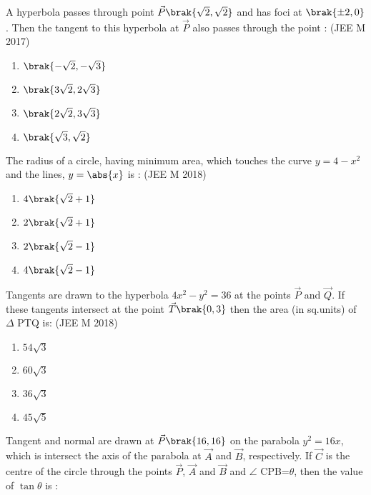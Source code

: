 
\iffalse
  \title{Conic-section}
  \author{Malakala bala subrahmanya aravind}
  \section{mcq-single}
\fi

\item A hyperbola passes through point $\vec{P}\brak{\sqrt2,\sqrt2}$  and  has  foci  at $\brak{\pm2,0}$. Then  the  tangent  to  this  hyperbola at $\vec{P}$ also passes through the point :
      \hfill{(JEE M 2017)} 
	\begin{enumerate}
    		\item  $\brak{-\sqrt2,-\sqrt3}$
    		\item  $\brak{3\sqrt2,2\sqrt3}$
    		\item  $\brak{2\sqrt2,3\sqrt3}$
    		\item  $\brak{\sqrt3,\sqrt2}$
	\end{enumerate}
\item  The radius of a circle, having minimum area, which touches the curve $y=4-x^2$ and the lines, $y=\abs{x}$ is : 
   \hfill{(JEE M 2018)}
	\begin{enumerate}
     		\item $4\brak{\sqrt2+1}$
     		\item $2\brak{\sqrt2+1}$
     		\item $2\brak{\sqrt2-1}$
     		\item $4\brak{\sqrt2-1}$
	\end{enumerate}
\item Tangents are drawn to the hyperbola $4x^2-y^2=36$ at the points $\vec{P}$ and $\vec{Q}$. If  these tangents intersect  at the point $\vec{T}\brak{0,3}$ then the area (in sq.units) of $\Delta$ PTQ is:
     \hfill{(JEE M 2018)}
	\begin{enumerate}
     		\item $54\sqrt3$
     		\item $60\sqrt3$
     		\item $36\sqrt3$ 
     		\item $45\sqrt5$
	\end{enumerate}
\item Tangent and normal are drawn at $\vec{P}\brak{16,16}$ on the parabola $y^2=16x$,
which is intersect the axis of the parabola at $\vec{A}$ and $\vec{B}$, respectively. If $\vec{C}$ is the centre of the circle through the points $\vec{P}$, $\vec{A}$ and $\vec{B}$ and $\angle$ CPB=$\theta$, then the value of $\tan{\theta}$ is :
